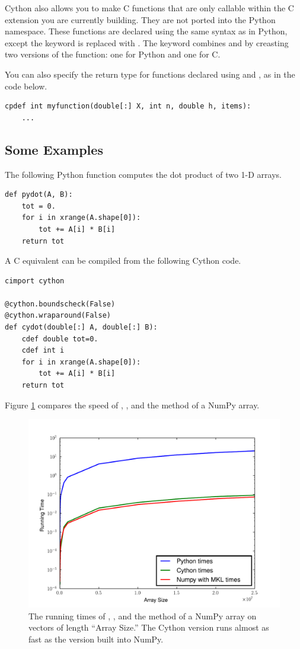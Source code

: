 Cython also allows you to make C functions that are only callable within the C extension you are currently building.
They are not ported into the Python namespace.
These functions are declared using the same syntax as in Python, except the keyword  is replaced with .
The keyword  combines  and  by creasting two versions of the function: one for Python and one for C.

You can also specify the return type for functions declared using  and , as in the code below.
\begin{lstlisting}
cpdef int myfunction(double[:] X, int n, double h, items):
    ...
\end{lstlisting}

\subsection*{Some Examples}
The following Python function computes the dot product of two 1-D arrays.
\begin{lstlisting}
def pydot(A, B):
    tot = 0.
    for i in xrange(A.shape[0]):
        tot += A[i] * B[i]
    return tot
\end{lstlisting}
A C equivalent can be compiled from the following Cython code.
\begin{lstlisting}
cimport cython

@cython.boundscheck(False)
@cython.wraparound(False)
def cydot(double[:] A, double[:] B):
    cdef double tot=0.
    cdef int i
    for i in xrange(A.shape[0]):
        tot += A[i] * B[i]
    return tot
\end{lstlisting}

Figure \ref{cython:dot} compares the speed of , , and the  method of a NumPy array.

\begin{figure}
\centering
\includegraphics[width=\textwidth]{dot.pdf}
\caption{The running times of , , and the  method of a NumPy array on vectors of length ``Array Size.''
The Cython version runs almost as fast as the version built into NumPy.}
\label{cython:dot}
\end{figure}

